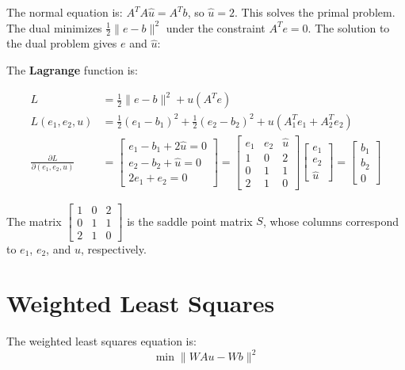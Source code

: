 \documentclass[]{article}
\begin{document}
The normal equation is: $A^T A \hat{u} = A^T b$, so $\hat{u} = 2$. This solves the primal problem. The dual minimizes $\frac{1}{2}\parallel e-b \parallel^2$ under the constraint $A^T e = 0$. The solution to the dual problem gives $e$ and $\hat{u}$:

The \textbf{Lagrange} function is:

\begin{align}
L &= \frac{1}{2}\parallel e-b \parallel^2 + u(A^T e) \\
L(e_1, e_2, u) &= \frac{1}{2}(e_1 - b_1 )^2 + \frac{1}{2}(e_2 - b_2 )^2 + u(A^{T}_{1} e_1 + A^{T}_{2} e_2) \\
\frac{\partial L}{\partial (e_1, e_2, u)} &= \begin{bmatrix}
	e_1 - b_1 + 2\hat{u} = 0 \\
	e_2 - b_2 + \hat{u} = 0 \\
	2e_1 + e_2 = 0 
\end{bmatrix} = \begin{bmatrix}
	e_1 & e_2 & \hat{u} \\
	1 & 0 & 2 \\
	0 & 1 & 1 \\
	2 & 1 & 0 
\end{bmatrix} \begin{bmatrix} e_1 \\ e_2 \\ \hat{u} \end{bmatrix} = \begin{bmatrix} b_1 \\ b_2 \\ 0 \end{bmatrix}
\end{align}

The matrix $
\begin{bmatrix}
1 & 0 & 2 \\
0 & 1 & 1 \\
2 & 1 & 0 
\end{bmatrix} $
is the saddle point matrix $S$, whose columns correspond to $e_1$, $e_2$, and $u$, respectively. 

\section{Weighted Least Squares} \label{Weighted Least Squares}
The weighted least squares equation is:
\begin{equation}
\min \parallel WAu - Wb \parallel^2 
\end{equation}
\end{document}
